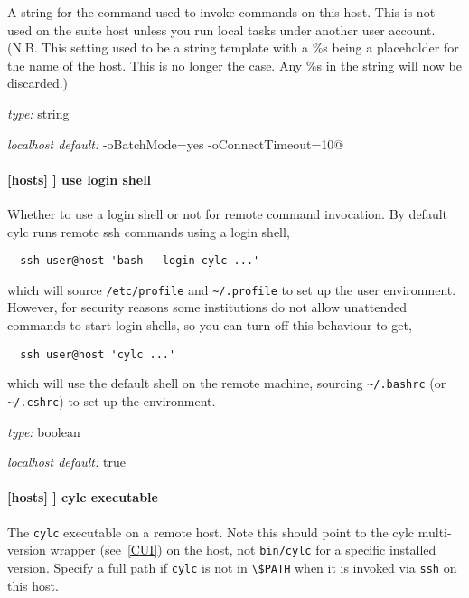A string for the command used to invoke commands on this host.
This is not used on the suite host unless you run local tasks under
another user account. (N.B. This setting used to be a string template with a \%s
being a placeholder for the name of the host. This is no longer the case. Any
\%s in the string will now be discarded.)

\begin{myitemize}
\item {\em type:} string
\item {\em localhost default:} \lstinline@ssh -oBatchMode=yes -oConnectTimeout=10@
\end{myitemize}

\paragraph[use login shell]{[hosts] \textrightarrow [[HOST]] \textrightarrow use login shell }

Whether to use a login shell or not for remote command invocation. By
default cylc runs remote ssh commands using a login shell,
\begin{lstlisting}
  ssh user@host 'bash --login cylc ...'
\end{lstlisting}
which will source \lstinline=/etc/profile= and
\lstinline=~/.profile= to set up the user environment.  However, for
security reasons some institutions do not allow unattended commands to
start login shells, so you can turn off this behaviour to get,
\begin{lstlisting}
  ssh user@host 'cylc ...'
\end{lstlisting}
which will use the default shell on the remote machine,
sourcing \lstinline=~/.bashrc= (or \lstinline=~/.cshrc=) to set up the
environment.

\begin{myitemize}
\item {\em type:} boolean
\item {\em localhost default:} true
\end{myitemize}

\paragraph[cylc executable]{[hosts] \textrightarrow [[HOST]] \textrightarrow cylc executable }

The \lstinline=cylc= executable on a remote host. Note this should point to the 
cylc multi-version wrapper (see~\ref{CUI}) on the host, not
\lstinline=bin/cylc= for a specific installed version.
Specify a full path if \lstinline=cylc= is not in \lstinline=\$PATH= when it is
invoked via \lstinline=ssh= on this host.

